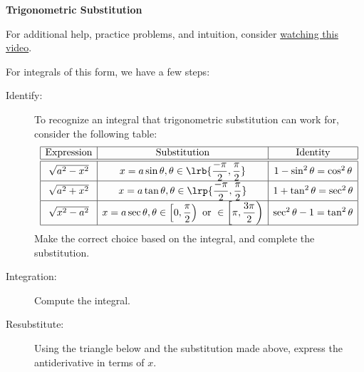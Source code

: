 
\chead{\today}
\graphicspath{ {\string~/Desktop} }
\usetikzlibrary{arrows}
\newcommand{\ans}[1]{ \noindent {\color{red} \textbf{Answer:} #1}}

\begin{center}
\textbf{Trigonometric Substitution}
\end{center}


\begin{aun}
For additional help, practice problems, and intuition, consider \href{https://www.youtube.com/watch?v=KGrMpamuVbw}{watching this video}.
\end{aun}
\begin{aun}
For integrals of this form, we have a few steps:
\begin{description}
\item[Identify:] To recognize an integral that trigonometric substitution can work for, consider the following table:
\[
\begin{array}{|c|c|c|}
\hline
\text{Expression} & \text{Substitution} & \text{Identity} \\ \hline\hline 
\sqrt{a^2 - x^2} & \displaystyle x = a \sin \theta, \theta \in \lrb{\frac{-\pi}{2}, \frac\pi2} & 1 - \sin^2 \theta = \cos^2 \theta\\ \hline 
\sqrt{a^2 + x^2} & \displaystyle x = a \tan \theta, \theta \in \lrp{\frac{-\pi}{2}, \frac\pi2} & 1 + \tan^2 \theta = \sec^2 \theta \\ \hline
\sqrt{x^2 - a^2} & \displaystyle x = a \sec\theta,  \theta \in \left [ 0, \frac\pi2 \right ) \text{ or } \in \left [ \pi, \frac{3\pi}{2} \right ) & \sec^2\theta - 1 = \tan^2 \theta \\ 
\hline 
\end{array}
\]
Make the correct choice based on the integral, and complete the substitution.
\item[Integration:] Compute the integral. 
\item[Resubstitute:] Using the triangle below and the substitution made above, express the antiderivative in terms of $x$. 
\begin{center}



\begin{tikzpicture}[x=0.75pt,y=0.75pt,yscale=-1,xscale=1]


\end{tikzpicture}
\end{center}
\end{description}
\end{aun}
